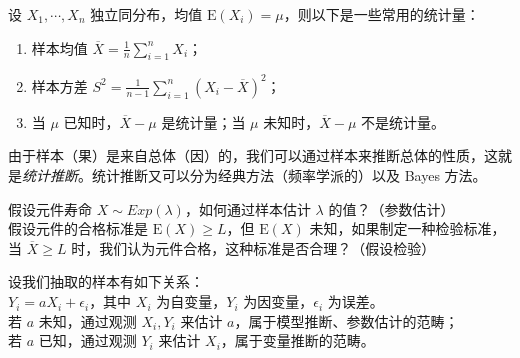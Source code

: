 \documentclass[../main.tex]{subfiles}
\begin{document}
\begin{example}
    设 $X_1,\cdots,X_n$ 独立同分布，均值 $\mathrm E(X_i)=\mu$，则以下是一些常用的统计量：
    \begin{enumerate}
        \item 样本均值 $\overline X=\frac1n\sum_{i=1}^nX_i$；
        \item 样本方差 $S^2=\frac1{n-1}\sum_{i=1}^n(X_i-\overline X)^2$；
        \item 当 $\mu$ 已知时，$\overline X-\mu$ 是统计量；当 $\mu$ 未知时，$\overline X-\mu$ 不是统计量。
    \end{enumerate}
\end{example}

由于样本（果）是来自总体（因）的，我们可以通过样本来推断总体的性质，这就是\emph{统计推断}。统计推断又可以分为经典方法（频率学派的）以及 Bayes 方法。

\begin{example}
    假设元件寿命 $X\sim Exp(\lambda)$，如何通过样本估计 $\lambda$ 的值？（参数估计）\\
    假设元件的合格标准是 $\mathrm E(X)\geq L$，但 $\mathrm E(X)$ 未知，如果制定一种检验标准，当 $\overline X\geq L$ 时，我们认为元件合格，这种标准是否合理？（假设检验）
\end{example}

\begin{example}
    设我们抽取的样本有如下关系：\\
    $Y_i=aX_i+\epsilon_i$，其中 $X_i$ 为自变量，$Y_i$ 为因变量，$\epsilon_i$ 为误差。\\
    若 $a$ 未知，通过观测 $X_i,Y_i$ 来估计 $a$，属于模型推断、参数估计的范畴；\\
    若 $a$ 已知，通过观测 $Y_i$ 来估计 $X_i$，属于变量推断的范畴。
\end{example}
\end{document}
